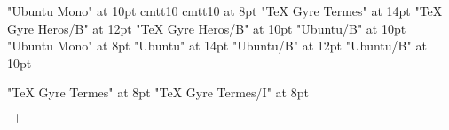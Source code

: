 




\let\oldtentt\tentt
\font\tentt "Ubuntu Mono" at 10pt
\ifx\tentt\nullfont
\font\tentt cmtt10
\font\eighttt cmtt10 at 8pt
\font\fourteenrm "TeX Gyre Termes" at 14pt
\font\twelvebf "TeX Gyre Heros/B" at 12pt
\font\tensansbf "TeX Gyre Heros/B" at 10pt
\else
\font\tenbf "Ubuntu/B" at 10pt
\font\eighttt "Ubuntu Mono" at 8pt
\font\fourteenrm "Ubuntu" at 14pt
\font\twelvebf "Ubuntu/B" at 12pt
\font\tensansbf "Ubuntu/B" at 10pt
\fi

\font\eightrm "TeX Gyre Termes" at 8pt
\font\eightit "TeX Gyre Termes/I" at 8pt

\def\titlefont{\fourteenrm \baselineskip=16.8pt \relax}

\def\chapterfont{\twelvebf
  \baselineskip 14.4pt \relax}

\def\sectionfont{\tensansbf}

\def\eightfont{\eightrm
  \let\it\eightit
  \let\tt\eighttt
  \baselineskip 9.6pt \relax}

\def\footnotehook{\eightfont}

\def\sectionQbreak#1\par{$\dashv$\bigbreak\noindent}


\def\begindocumenthook{\activettchar`\let\begindocumenthook\relax}

\let\ORIGtitle\title
\let\ORIGbeginchapter\beginchapter
\let\ORIGbeginsection\beginsection

\def\title{\begindocumenthook\ORIGtitle}
\def\beginchapter{\begindocumenthook\ORIGbeginchapter}
\def\beginsection{\begindocumenthook\ORIGbeginsection} 
